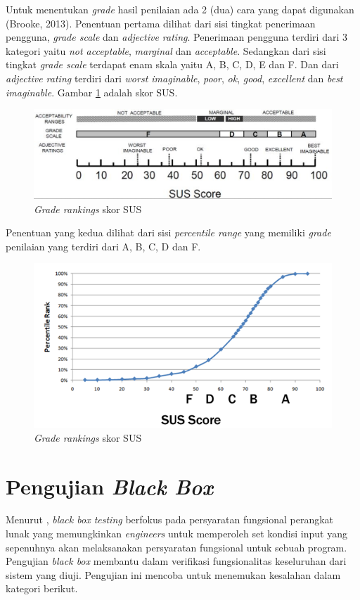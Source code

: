 Untuk menentukan \textit{grade} hasil penilaian ada 2 (dua) cara
yang dapat digunakan (Brooke, 2013). Penentuan pertama dilihat dari sisi tingkat penerimaan pengguna, \textit{grade scale} dan \textit{adjective rating}. Penerimaan pengguna terdiri dari 3 kategori yaitu \textit{not acceptable}, \textit{marginal} dan \textit{acceptable}. Sedangkan dari sisi tingkat \textit{grade scale} terdapat enam skala yaitu A, B, C, D, E dan F. Dan
dari \textit{adjective rating} terdiri dari \textit{worst imaginable},
\textit{poor}, \textit{ok}, \textit{good}, \textit{excellent} dan \textit{best imaginable}. Gambar \ref{susScore2} adalah skor SUS.
\begin{figure}[H]
	\centering
	\includegraphics[width=\textwidth]{gambar/susscore}
	\caption{\textit{Grade rankings} skor SUS \citep{bangor2009}}
	\label{susScore2}
\end{figure}
Penentuan yang kedua dilihat dari sisi \textit{percentile range } yang memiliki \textit{grade} penilaian yang terdiri dari A, B, C, D dan F. 

\begin{figure}[H]
	\centering
	\includegraphics[width=\textwidth]{gambar/pr}
	\caption{\textit{Grade rankings} skor SUS \citep{sauro2011}}
	\label{pr}
\end{figure}

\section{Pengujian \textit{Black Box}}
Menurut \citep{pressman2010}, \textit{black box testing }berfokus pada persyaratan fungsional perangkat lunak yang memungkinkan \textit{engineers} untuk memperoleh set kondisi input yang sepenuhnya akan melaksanakan persyaratan fungsional untuk sebuah program. Pengujian \textit{black box} membantu dalam verifikasi fungsionalitas keseluruhan dari sistem yang diuji. Pengujian ini mencoba untuk menemukan kesalahan dalam kategori berikut.

